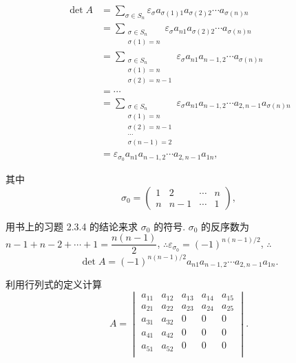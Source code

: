 \documentclass[color=black,device=normal,lang=cn,mode=geye]{elegantnote}
\begin{document}
\begin{solution}
    \begin{align*}
        \det A & =\sum\limits_{\sigma\in S_n}\varepsilon_\sigma a_{\sigma(1)1}a_{\sigma(2)2}\cdots a_{\sigma(n)n} \\
        & =\sum\limits_{\substack{\sigma\in S_n\\\sigma(1)=n}}\varepsilon_\sigma a_{n1}a_{\sigma(2)2}\cdots a_{\sigma(n)n} \\
        & =\sum\limits_{\substack{\sigma\in S_n\\\sigma(1)=n\\\sigma(2)=n-1}}\varepsilon_\sigma a_{n1}a_{n-1,2}\cdots a_{\sigma(n)n} \\
        & =\cdots \\
        & =\sum\limits_{\substack{\sigma\in S_n\\\sigma(1)=n\\\sigma(2)=n-1\\\cdots\\\sigma(n-1)=2}}\varepsilon_\sigma a_{n1}a_{n-1,2}\cdots a_{2,n-1}a_{\sigma(n)n} \\
        & =\varepsilon_{\sigma_0}a_{n1}a_{n-1,2}\cdots a_{2,n-1}a_{1n},
    \end{align*}

    其中
    \[\sigma_0=\begin{pmatrix}
        1 & 2 & \cdots & n \\
        n & n-1 & \cdots & 1
    \end{pmatrix},\]

    用书上的习题 2.3.4 的结论来求 $\sigma_0$ 的符号. $\sigma_0$ 的反序数为 $n-1+n-2+\cdots+1=\dfrac{n(n-1)}{2}$, $\therefore\varepsilon_{\sigma_0}=(-1)^{n(n-1)/2}$, $\therefore$
    \[\det A=(-1)^{n(n-1)/2}a_{n1}a_{n-1,2}\cdots a_{2,n-1}a_{1n}.\]
\end{solution}
\begin{exercisec}[4.1.6]
    利用行列式的定义计算
    \[A=\begin{vmatrix}
        a_{11} & a_{12} & a_{13} & a_{14} & a_{15} \\
        a_{21} & a_{22} & a_{23} & a_{24} & a_{25} \\
        a_{31} & a_{32} & 0 & 0 & 0 \\
        a_{41} & a_{42} & 0 & 0 & 0 \\
        a_{51} & a_{52} & 0 & 0 & 0 \\
    \end{vmatrix}.\]
\end{exercisec}
\end{document}
